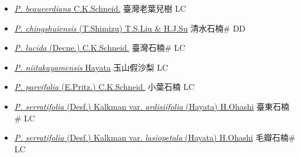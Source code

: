 \begin{itemize}
  \begin{itemize}
        \item[] \href{http://www.theplantlist.org/tpl1.1/search?q=Photinia+beauverdiana}{\textit{P. beauverdiana} C.K.Schneid.}     臺灣老葉兒樹 LC
        \item[] \href{http://www.theplantlist.org/tpl1.1/search?q=Photinia+chingshuiensis}{\textit{P. chingshuiensis} (T.Shimizu) T.S.Liu \& H.J.Su}     清水石楠\# DD
        \item[] \href{http://www.theplantlist.org/tpl1.1/search?q=Photinia+lucida}{\textit{P. lucida} (Decne.) C.K.Schneid.}     臺灣石楠\# LC
        \item[] \href{http://www.theplantlist.org/tpl1.1/search?q=Photinia+niitakayamensis}{\textit{P. niitakayamensis} Hayata}   玉山假沙梨 LC
        \item[] \href{http://www.theplantlist.org/tpl1.1/search?q=Photinia+parvifolia}{\textit{P. parvifolia} (E.Pritz.) C.K.Schneid.}     小葉石楠 LC
        \item[] \href{http://www.theplantlist.org/tpl1.1/search?q=Photinia+serratifolia+var.+ardisiifolia}{\textit{P. serratifolia} (Desf.) Kalkman var. \textit{ardisiifolia} (Hayata) H.Ohashi}   臺東石楠\# LC
        \item[] \href{http://www.theplantlist.org/tpl1.1/search?q=Photinia+serratifolia+var.+lasiopetala}{\textit{P. serratifolia} (Desf.) Kalkman var. \textit{lasiopetala} (Hayata) H.Ohashi}   毛瓣石楠\# LC

\end{itemize}
\end{itemize}
